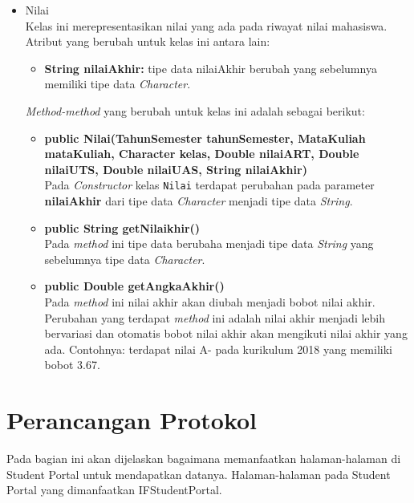 \begin{enumerate}
\begin{itemize}
				\item Nilai\\
				Kelas ini merepresentasikan nilai yang ada pada riwayat nilai mahasiswa. Atribut yang berubah untuk kelas ini antara lain:
				\begin{itemize}
					\item \textbf{String nilaiAkhir:} tipe data nilaiAkhir berubah yang sebelumnya memiliki tipe data \textit{Character}.
				\end{itemize}
			\textit{Method-method} yang berubah untuk kelas ini adalah sebagai berikut:
				\begin{itemize}
					\item \textbf{public Nilai(TahunSemester tahunSemester, MataKuliah mataKuliah, Character kelas, Double nilaiART, Double nilaiUTS, Double nilaiUAS, String nilaiAkhir)}\\
						Pada \textit{Constructor} kelas \texttt{Nilai} terdapat perubahan pada parameter \textbf{nilaiAkhir} dari tipe data \textit{Character} menjadi tipe data \textit{String}.
						
					\item \textbf{public String getNilaikhir()}\\
						Pada \textit{method} ini tipe data berubaha menjadi tipe data \textit{String} yang sebelumnya tipe data \textit{Character}.
					
					\item \textbf{public Double getAngkaAkhir()}\\
						Pada \textit{method} ini nilai akhir akan diubah menjadi bobot nilai akhir. Perubahan yang terdapat \textit{method} ini adalah nilai akhir menjadi lebih bervariasi dan otomatis bobot nilai akhir akan mengikuti nilai akhir yang ada. Contohnya: terdapat nilai A- pada kurikulum 2018 yang memiliki bobot 3.67. 
				\end{itemize}
		\end{itemize}
\end{enumerate}

\section{Perancangan Protokol}
Pada bagian ini akan dijelaskan bagaimana memanfaatkan halaman-halaman di Student Portal untuk mendapatkan datanya. Halaman-halaman pada Student Portal yang dimanfaatkan IFStudentPortal.
